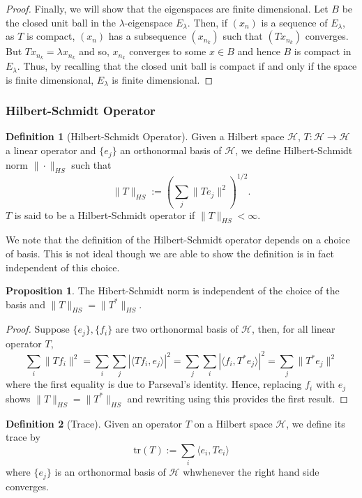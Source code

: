 \documentclass[]{article}
\theoremstyle{definition}
\theoremstyle{definition}
\newtheorem{definition}{Definition}[section]
\newtheorem{proposition}{Proposition}[section]
\begin{document}
\begin{proof}
  Finally, we will show that the eigenspaces are finite dimensional. Let 
  \(B\) be the closed unit ball in the \(\lambda\)-eigenspace \(E_\lambda\). 
  Then, if \((x_n)\) is a sequence of \(E_\lambda\), as \(T\) is compact, 
  \((x_n)\) has a subsequence \((x_{n_k})\) such that \((Tx_{n_k})\) converges.
  But \(Tx_{n_k} = \lambda x_{n_k}\) and so, \(x_{n_k}\) converges to 
  some \(x \in B\) and hence \(B\) is compact in \(E_\lambda\). Thus, by recalling 
  that the closed unit ball is compact if and only if the space is finite dimensional,
  \(E_\lambda\) is finite dimensional.
\end{proof}

\subsubsection{Hilbert-Schmidt Operator}

\begin{definition}[Hilbert-Schmidt Operator]
  Given a Hilbert space \(\mathcal{H}\), \(T : \mathcal{H} \to \mathcal{H}\) 
  a linear operator and \(\{e_j\}\) an orthonormal basis of \(\mathcal{H}\), 
  we define Hilbert-Schmidt norm \(\|\cdot\|_{HS}\) such that 
  \[\|T\|_{HS} := \left(\sum_j \|Te_j\|^2\right)^{1 / 2}.\]
  \(T\) is said to be a Hilbert-Schmidt operator if \(\|T\|_{HS} < \infty\).
\end{definition}

We note that the definition of the Hilbert-Schmidt operator depends on a choice 
of basis. This is not ideal though we are able to show the definition is in fact 
independent of this choice.

\begin{proposition}
  The Hibert-Schmidt norm is independent of the choice of the basis and 
  \(\|T\|_{HS} = \|T^*\|_{HS}\).
\end{proposition}
\begin{proof}
  Suppose \(\{e_j\}, \{f_i\}\) are two orthonormal basis of \(\mathcal{H}\), 
  then, for all linear operator \(T\), 
  \[\sum_i \|Tf_i\|^2 = \sum_i \sum_j |\langle Tf_i, e_j\rangle|^2 = 
    \sum_j \sum_i |\langle f_i, T^* e_j\rangle|^2 = 
    \sum_j \|T^* e_j\|^2\]
  where the first equality is due to Parseval's identity. Hence, 
  replacing \(f_i\) with \(e_j\) shows \(\|T\|_{HS} = \|T^*\|_{HS}\) and 
  rewriting using this provides the first result.
\end{proof}

\begin{definition}[Trace]
  Given an operator \(T\) on a Hilbert space \(\mathcal{H}\), we define 
  its trace by 
  \[\text{tr}(T) := \sum_i \langle e_i, Te_i\rangle\]
  where \(\{e_j\}\) is an orthonormal basis of \(\mathcal{H}\) 
  whwhenever the right hand side converges.
\end{definition}
\end{document}
